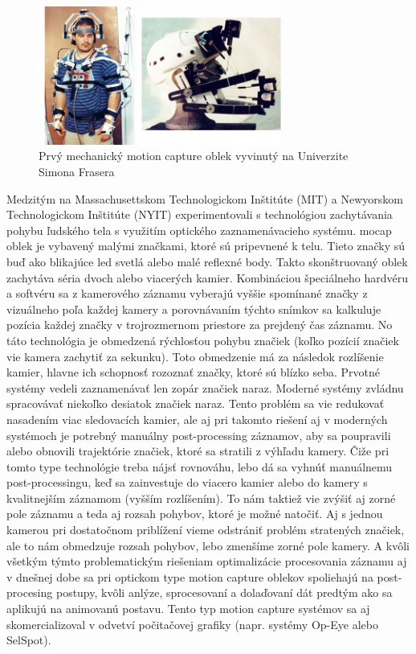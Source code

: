 \begin{figure}[!htbp]
  \centering
  \includegraphics[width=8cm]{img/firstMechMocapSuit.jpg}
  \caption{Prvý mechanický motion capture oblek vyvinutý na Univerzite Simona Frasera}
  \label{mechMocapFig}
\end{figure}

Medzitým na Massachusettskom Technologickom Inštitúte (MIT) a Newyorskom Technologickom Inštitúte (NYIT) experimentovali s technológiou zachytávania pohybu ľudského tela s využitím optického zaznamenávacieho systému.
\acrlong{mocap} oblek je vybavený malými značkami, ktoré sú pripevnené k telu. Tieto značky sú buď ako blikajúce \acrshort{led} svetlá alebo malé reflexné body. Takto skonštruovaný oblek zachytáva séria dvoch alebo viacerých kamier. Kombináciou špeciálneho hardvéru a softvéru sa z kamerového záznamu vyberajú vyššie spomínané značky z vizuálneho poľa každej kamery a porovnávaním týchto snímkov sa kalkuluje pozícia každej značky v trojrozmernom priestore za prejdený čas záznamu.
No táto technológia je obmedzená rýchlosťou pohybu značiek (koľko pozícií značiek vie kamera zachytiť za sekunku). Toto obmedzenie má za následok rozlíšenie kamier, hlavne ich schopnosť rozoznať značky, ktoré sú blízko seba. Prvotné systémy vedeli zaznamenávať len zopár značiek naraz. Moderné systémy zvládnu spracovávať niekoľko desiatok značiek naraz. Tento problém sa vie redukovať nasadením viac sledovacích kamier, ale aj pri takomto riešení aj v moderných systémoch je potrebný manuálny post-processing záznamov, aby sa poupravili alebo obnovili trajektórie značiek, ktoré sa stratili z výhľadu kamery. Čiže pri tomto type technológie treba nájsť rovnováhu, lebo dá sa vyhnúť manuálnemu post-processingu, keď sa zainvestuje do viacero kamier alebo do kamery s kvalitnejším záznamom (vyšším rozlíšením). To nám taktiež vie zvýšiť aj zorné pole záznamu a teda aj rozsah pohybov, ktoré je možné natočiť. Aj s jednou kamerou pri dostatočnom priblížení vieme odstrániť problém stratených značiek, ale to nám obmedzuje rozsah pohybov, lebo zmenšíme zorné pole kamery. A kvôli všetkým týmto problematickým riešeniam optimalizácie procesovania záznamu aj v dnešnej dobe sa pri optickom type motion capture oblekov spoliehajú na post-procesing postupy, kvôli anlýze, sprocesovaní a dolaďovaní dát predtým ako sa aplikujú na animovanú postavu.
Tento typ motion capture systémov sa aj skomercializoval v odvetví počitačovej grafiky (napr. systémy Op-Eye alebo SelSpot).

